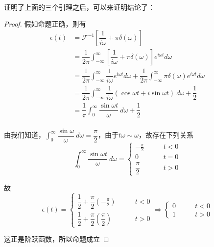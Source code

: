         证明了上面的三个引理之后，可以来证明结论了：
        \begin{proof}
            假如命题正确，则有
            \begin{equation*}
                \begin{split}
                    \epsilon(t)&=\mathscr{F}^{-1}[\dfrac{1}{i\omega}+\pi\delta(\omega)]\\
                    &=\dfrac{1}{2\pi}\int_{-\infty}^{\infty}[\dfrac{1}{i\omega}+\pi\delta(\omega)] e^{i\omega t} d\omega\\
                    &=\dfrac{1}{2\pi}\int_{-\infty}^{\infty}\dfrac{1}{i\omega} e^{i\omega t} d\omega+\dfrac{1}{2\pi}\int_{-\infty}^{\infty}\pi\delta(\omega) e^{i\omega t} d\omega\\
                    &=\dfrac{1}{2\pi}\int_{-\infty}^{\infty}\dfrac{1}{i\omega} (\cos \omega t +i \sin\omega t)\ d\omega+\dfrac{1}{2}\\
                    &=\dfrac{1}{\pi}\int_{0}^{\infty}\dfrac{\sin\omega t}{\omega}\ d\omega+\dfrac{1}{2}\\
                \end{split}
            \end{equation*}

            由我们知道，$\int_{0}^{\infty}\dfrac{\sin\omega}{\omega}\ d\omega=\dfrac{\pi}{2}$，由于$t\omega\sim\omega$，故存在下列关系
            \begin{equation*}
                \int_{0}^{\infty}\dfrac{\sin\omega t}{\omega}\ d\omega=\left\{\begin{aligned}
                -\frac{\pi}{2}&\qquad t<0\\
                0&\qquad t=0\\
                \dfrac{\pi}{2}&\qquad t>0
                \end{aligned}\right.
            \end{equation*}

            故
            \begin{equation*}
                \epsilon(t)=\left\{\begin{aligned}
                \dfrac 1 2 + \dfrac \pi 2(-\frac{\pi}{2})&\qquad t<0\\
                \dfrac 1 2 + \dfrac \pi 2(\dfrac{\pi}{2})&\qquad t>0
                \end{aligned}\right.\Rightarrow\left\{\begin{aligned}
                0&\qquad t<0\\
                1&\qquad t>0
                \end{aligned}\right.
            \end{equation*}

            这正是阶跃函数，所以命题成立
        \end{proof}
